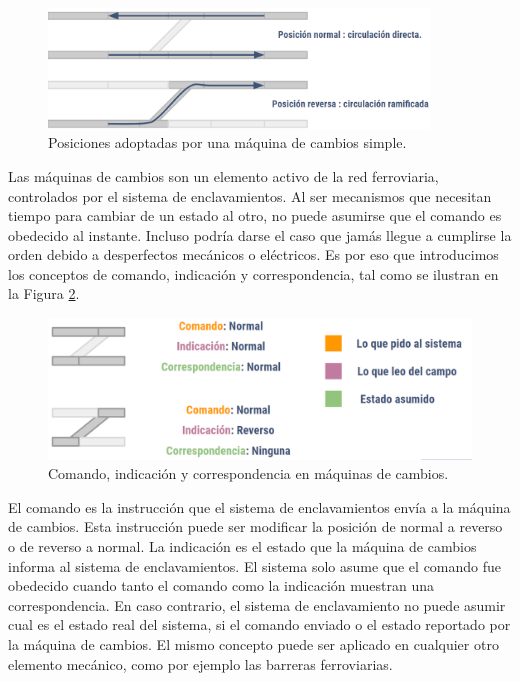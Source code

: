     \begin{figure}[H]
        \centering
        \includegraphics[width=0.9\textwidth]{Figuras/cambio_3.PNG}
        \centering\caption{Posiciones adoptadas por una máquina de cambios simple.}
        \label{fig:cambios_3}
    \end{figure}

    Las máquinas de cambios son un elemento activo de la red ferroviaria, controlados por el sistema de enclavamientos. Al ser mecanismos que necesitan tiempo para cambiar de un estado al otro, no puede asumirse que el comando es obedecido al instante. Incluso podría darse el caso que jamás llegue a cumplirse la orden debido a desperfectos mecánicos o eléctricos. Es por eso que introducimos los conceptos de comando, indicación y correspondencia, tal como se ilustran en la Figura \ref{fig:cambios_4}.

    \begin{figure}[H]
        \centering
        \includegraphics[width=1\textwidth]{Figuras/cambios}
        \centering\caption{Comando, indicación y correspondencia en máquinas de cambios.}
        \label{fig:cambios_4}
    \end{figure}
    
    El comando es la instrucción que el sistema de enclavamientos envía a la máquina de cambios. Esta instrucción puede ser modificar la posición de normal a reverso o de reverso a normal. La indicación es el estado que la máquina de cambios informa al sistema de enclavamientos. El sistema solo asume que el comando fue obedecido cuando tanto el comando como la indicación muestran una correspondencia. En caso contrario, el sistema de enclavamiento no puede asumir cual es el estado real del sistema, si el comando enviado o el estado reportado por la máquina de cambios. El mismo concepto puede ser aplicado en cualquier otro elemento mecánico, como por ejemplo las barreras ferroviarias.

